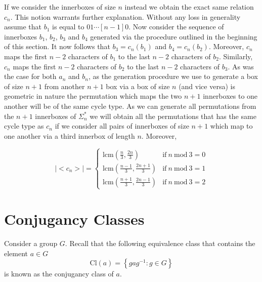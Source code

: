 \documentclass[a4paper,10pt]{article}
\begin{document}
If we consider the innerboxes of size $n$ instead we obtain the exact same relation $c_n$. This notion warrants further explanation. Without any loss in generality assume that $b_1$ is equal to $01\cdots[n-1]0$. Now consider the sequence of innerboxes $b_1$, $b_2$, $b_3$ and $b_4$ generated via the procedure outlined in the beginning of this section. It now follows that $b_3 = c_n(b_1)$ and $b_4 = c_n(b_2)$. Moreover, $c_n$ maps the first $n-2$ characters of $b_1$ to the last $n-2$ characters of $b_2$. Similarly, $c_n$ maps the first $n-2$ characters of $b_2$ to the last $n-2$ characters of $b_3$. As was the case for both $a_n$ and $b_n$, as the generation procedure we use to generate a box of size $n+1$ from another $n+1$ box via a box of size $n$ (and vice versa) is geometric in nature the permutation which maps the two $n+1$ innerboxes to one another will be of the same cycle type. As we can generate all permutations from the $n+1$ innerboxes of $\Sigma_n^*$ we will obtain all the permutations that has the same cycle type as $c_n$ if we consider all pairs of innerboxes of size $n+1$ which map to one another via a third innerbox of length $n$. Moreover,

\begin{equation}
|\!\!<\!\!c_n\!\!>\!\!|= \left\{
\begin{array}{ll}
\textrm{lcm}(\frac{n}{3},\frac{2n}{3}) &\textrm{if}~n~\textrm{mod}~3=0\\
\textrm{lcm}(\frac{n-1}{3},\frac{2n+1}{3}) &\textrm{if}~n~\textrm{mod}~3=1\\
\textrm{lcm}(\frac{n+1}{3},\frac{2n-1}{3}) &\textrm{if}~n~\textrm{mod}~3=2
\end{array}
\right.
\end{equation}

\section{Conjugancy Classes}
Consider a group $G$. Recall that the following equivalence class that contains the element $a\in G$
\begin{equation}
 \textrm{Cl} (a)=\left\{gag^{-1}:g\in G\right\}
\end{equation}
is known as the conjugancy class of $a$. 
\end{document}
